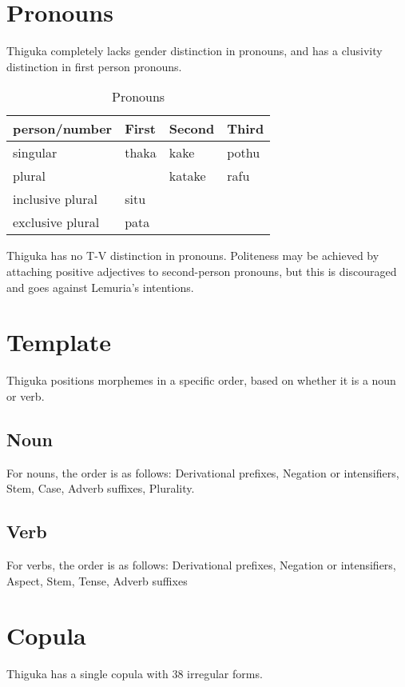 \section{Pronouns}
Thiguka completely lacks gender distinction in pronouns, and has a clusivity distinction in first person pronouns.

\begin{table}[h!]
    \centering
    \caption{Pronouns}
    \begin{tabularx}{15cm}{|X|X|X|X|}
        \hline
        person/number & \textbf{First} & \textbf{Second} & \textbf{Third} \\
        \hline
        singular & thaka & kake & pothu \\
        plural   & & katake & rafu \\
        inclusive plural & situ & & \\
        exclusive plural & pata & & \\
        \hline
    \end{tabularx}
\end{table}

Thiguka has no T-V distinction in pronouns. Politeness may be achieved by attaching positive adjectives to second-person pronouns, but this is discouraged and goes against Lemuria's intentions.




\section{Template}
Thiguka positions morphemes in a specific order, based on whether it is a noun or verb.

\subsection{Noun}
For nouns, the order is as follows: Derivational prefixes, Negation or intensifiers, Stem, Case, Adverb suffixes, Plurality.

\subsection{Verb}
For verbs, the order is as follows: Derivational prefixes, Negation or intensifiers, Aspect, Stem, Tense, Adverb suffixes

\section{Copula}
Thiguka has a single copula with 38 irregular forms.

